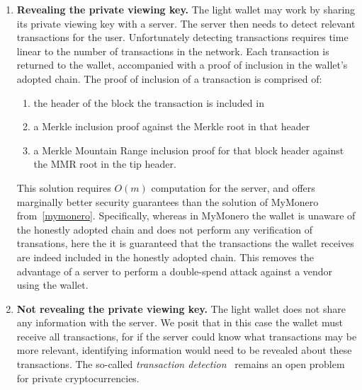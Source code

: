 \begin{enumerate}
    \item \textbf{Revealing the private viewing key.} The light wallet may work by sharing its private viewing key with a server. The server then needs to detect relevant transactions for the user. Unfortunately detecting transactions requires time linear to the number of transactions in the network. Each transaction is returned to the wallet, accompanied with a proof of inclusion in the wallet's adopted chain. The proof of inclusion of a transaction is comprised of:
    \begin{enumerate}
        \item the header of the block the transaction is included in
        \item a Merkle inclusion proof against the Merkle root in that header
        \item a Merkle Mountain Range inclusion proof for that block header against the MMR root in the tip header.
    \end{enumerate}
    This solution requires $O(m)$ computation for the server, and offers marginally better security guarantees than the solution of MyMonero from~\cref{mymonero}. Specifically, whereas in MyMonero the wallet is unaware of the honestly adopted chain and does not perform any verification of transations, here the it is guaranteed that the transactions the wallet receives are indeed included in the honestly adopted chain. This removes the advantage of a server to perform a double-spend attack against a vendor using the wallet.
    \item \textbf{Not revealing the private viewing key.} The light wallet does not share any information with the server. We posit that in this case the wallet must receive all transactions, for if the server could know what transactions may be more relevant, identifying information would need to be revealed about these transactions. The so-called \emph{transaction detection}~\cite{compact-blocks} remains an open problem for private cryptocurrencies.
\end{enumerate}
